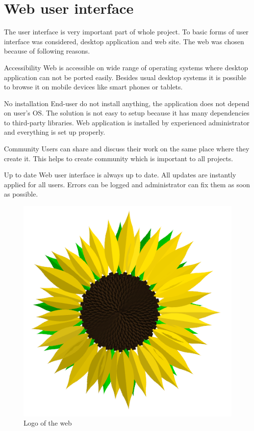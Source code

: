 
\section{Web user interface}

The user interface is very important part of whole project.
To basic forms of user interface was considered, desktop application and web site.
The web was chosen because of following reasons.

\begin{description*}
	\item[Accessibility]
		Web is accessible on wide range of operating systems where desktop application can not be ported easily.
		Besides usual desktop systems it is possible to browse it on mobile devices like smart phones or tablets.		
	\item[No installation]
		End-user do not install anything, the application does not depend on user's OS. 
		The solution is not easy to setup because it has many dependencies to third-party libraries.
		Web application is installed by experienced administrator and everything is set up properly.
	\item[Community]
		Users can share and discuss their work on the same place where they create it.
		This helps to create community which is important to all projects.
	\item[Up to date]
		Web user interface is always up to date.
		All updates are instantly applied for all users.
		Errors can be logged and administrator can fix them as soon as possible.		
\end{description*}

\begin{figure}
	\vspace{-20pt}
	\includegraphics[width=\linewidth]{Sunflower}
	\caption{Logo of the web}
	\label{fig:logo}
	\vspace{-20pt}
\end{figure}

